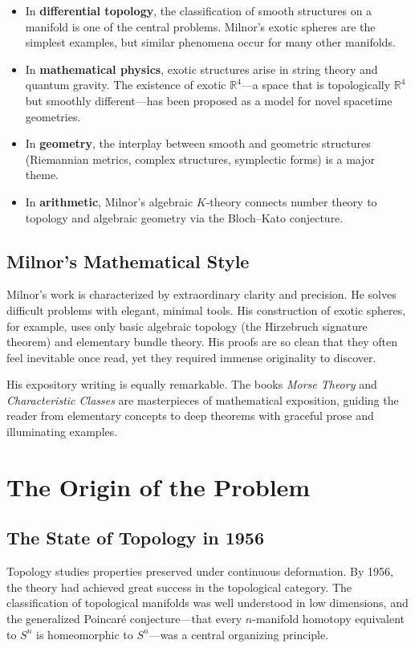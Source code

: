 \begin{itemize}
\item In \textbf{differential topology}, the classification of smooth structures on a manifold is one of the central problems. Milnor's exotic spheres are the simplest examples, but similar phenomena occur for many other manifolds.
\item In \textbf{mathematical physics}, exotic structures arise in string theory and quantum gravity. The existence of exotic $\mathbb{R}^4$---a space that is topologically $\mathbb{R}^4$ but smoothly different---has been proposed as a model for novel spacetime geometries.
\item In \textbf{geometry}, the interplay between smooth and geometric structures (Riemannian metrics, complex structures, symplectic forms) is a major theme.
\item In \textbf{arithmetic}, Milnor's algebraic $K$-theory connects number theory to topology and algebraic geometry via the Bloch--Kato conjecture.
\end{itemize}

\subsection{Milnor's Mathematical Style}

Milnor's work is characterized by extraordinary clarity and precision. He solves difficult problems with elegant, minimal tools. His construction of exotic spheres, for example, uses only basic algebraic topology (the Hirzebruch signature theorem) and elementary bundle theory. His proofs are so clean that they often feel inevitable once read, yet they required immense originality to discover.

His expository writing is equally remarkable. The books \emph{Morse Theory} and \emph{Characteristic Classes} are masterpieces of mathematical exposition, guiding the reader from elementary concepts to deep theorems with graceful prose and illuminating examples.

\section{The Origin of the Problem}

\subsection{The State of Topology in 1956}

Topology studies properties preserved under continuous deformation. By 1956, the theory had achieved great success in the topological category. The classification of topological manifolds was well understood in low dimensions, and the generalized Poincaré conjecture---that every $n$-manifold homotopy equivalent to $S^n$ is homeomorphic to $S^n$---was a central organizing principle.

